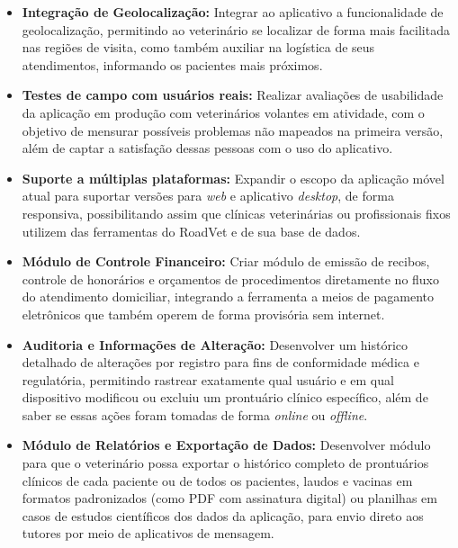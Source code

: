 \begin{itemize}
    \item \textbf{Integração de Geolocalização:} Integrar ao aplicativo a funcionalidade de geolocalização, permitindo ao veterinário se localizar de forma mais facilitada nas regiões de visita, como também auxiliar na logística de seus atendimentos, informando os pacientes mais próximos.  
    
    \item \textbf{Testes de campo com usuários reais:} Realizar avaliações de usabilidade da aplicação em produção com veterinários volantes em atividade, com o objetivo de mensurar possíveis problemas não mapeados na primeira versão, além de captar a satisfação dessas pessoas com o uso do aplicativo.

    \item \textbf{Suporte a múltiplas plataformas:} Expandir o escopo da aplicação móvel atual para suportar versões para \textit{web} e aplicativo \textit{desktop}, de forma responsiva, possibilitando assim que clínicas veterinárias ou profissionais fixos utilizem das ferramentas do RoadVet e de sua base de dados.  

    \item \textbf{Módulo de Controle Financeiro:}  Criar módulo de emissão de recibos, controle de honorários e orçamentos de procedimentos diretamente no fluxo do atendimento domiciliar, integrando a ferramenta a meios de pagamento eletrônicos que também operem de forma provisória sem internet.

    \item \textbf{Auditoria e Informações de Alteração:} Desenvolver um histórico detalhado de alterações por registro para fins de conformidade médica e regulatória, permitindo rastrear exatamente qual usuário e em qual dispositivo modificou ou excluiu um prontuário clínico específico, além de saber se essas ações foram tomadas de forma \textit{online} ou \textit{offline}.

    \item \textbf{Módulo de Relatórios e Exportação de Dados:}  Desenvolver módulo para que o veterinário possa exportar o histórico completo de prontuários clínicos de cada paciente ou de todos os pacientes, laudos e vacinas em formatos padronizados (como PDF com assinatura digital) ou planilhas em casos de estudos científicos dos dados da aplicação, para envio direto aos tutores por meio de aplicativos de mensagem.


\end{itemize}
